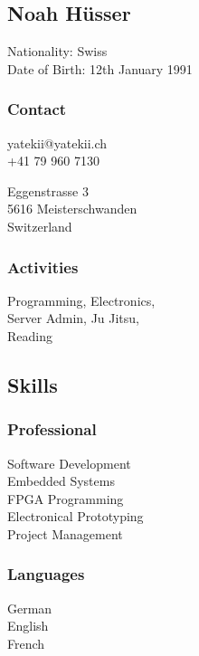 \documentclass[]{resume}
\begin{document}
%
%
%
\begin{facts}
\section{Noah Hüsser}
\sectionsep
\sectionsep

Nationality: Swiss\\
Date of Birth: 12th January 1991
\sectionsep

\subsubsection{Contact}
yatekii@yatekii.ch\\
+41 79 960 7130\par
\vspace{\baselineskip}
Eggenstrasse 3\\
5616 Meisterschwanden\\
Switzerland
\sectionsep

\subsubsection{Activities}
Programming, Electronics,\\
Server Admin, Ju Jitsu,\\
Reading
\sectionsep


\subsection{Skills}

\subsubsection{Professional}
Software Development\\
Embedded Systems\\
FPGA Programming\\
Electronical Prototyping\\
Project Management
\sectionsep

\subsubsection{Languages}
German \\
English \\
French 
\sectionsep


\end{facts}
\end{document}
